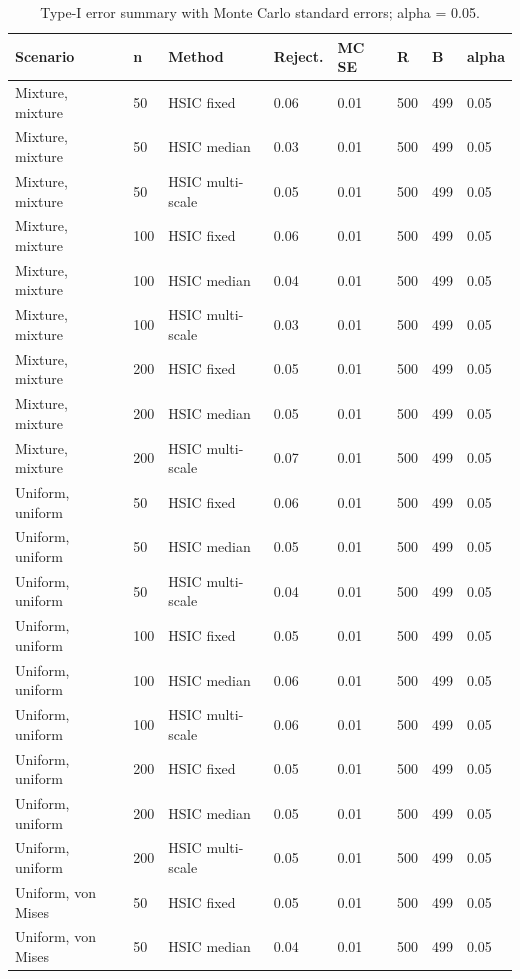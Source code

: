 \begin{table}[!htbp]
\centering
\scriptsize
\caption{Type-I error summary with Monte Carlo standard errors; alpha = 0.05.}
\label{tab:type1}
\begin{tabular}{llllllll}
\toprule
Scenario & n & Method & Reject. & MC SE & R & B & alpha
\\
\midrule
Mixture, mixture &  50 & HSIC fixed & 0.06 & 0.01 & 500 & 499 & 0.05\\
Mixture, mixture &  50 & HSIC median & 0.03 & 0.01 & 500 & 499 & 0.05\\
Mixture, mixture &  50 & HSIC multi-scale & 0.05 & 0.01 & 500 & 499 & 0.05\\
Mixture, mixture & 100 & HSIC fixed & 0.06 & 0.01 & 500 & 499 & 0.05\\
Mixture, mixture & 100 & HSIC median & 0.04 & 0.01 & 500 & 499 & 0.05\\
Mixture, mixture & 100 & HSIC multi-scale & 0.03 & 0.01 & 500 & 499 & 0.05\\
Mixture, mixture & 200 & HSIC fixed & 0.05 & 0.01 & 500 & 499 & 0.05\\
Mixture, mixture & 200 & HSIC median & 0.05 & 0.01 & 500 & 499 & 0.05\\
Mixture, mixture & 200 & HSIC multi-scale & 0.07 & 0.01 & 500 & 499 & 0.05\\
Uniform, uniform &  50 & HSIC fixed & 0.06 & 0.01 & 500 & 499 & 0.05\\
Uniform, uniform &  50 & HSIC median & 0.05 & 0.01 & 500 & 499 & 0.05\\
Uniform, uniform &  50 & HSIC multi-scale & 0.04 & 0.01 & 500 & 499 & 0.05\\
Uniform, uniform & 100 & HSIC fixed & 0.05 & 0.01 & 500 & 499 & 0.05\\
Uniform, uniform & 100 & HSIC median & 0.06 & 0.01 & 500 & 499 & 0.05\\
Uniform, uniform & 100 & HSIC multi-scale & 0.06 & 0.01 & 500 & 499 & 0.05\\
Uniform, uniform & 200 & HSIC fixed & 0.05 & 0.01 & 500 & 499 & 0.05\\
Uniform, uniform & 200 & HSIC median & 0.05 & 0.01 & 500 & 499 & 0.05\\
Uniform, uniform & 200 & HSIC multi-scale & 0.05 & 0.01 & 500 & 499 & 0.05\\
Uniform, von Mises &  50 & HSIC fixed & 0.05 & 0.01 & 500 & 499 & 0.05\\
Uniform, von Mises &  50 & HSIC median & 0.04 & 0.01 & 500 & 499 & 0.05\\

\end{tabular}
\end{table}

